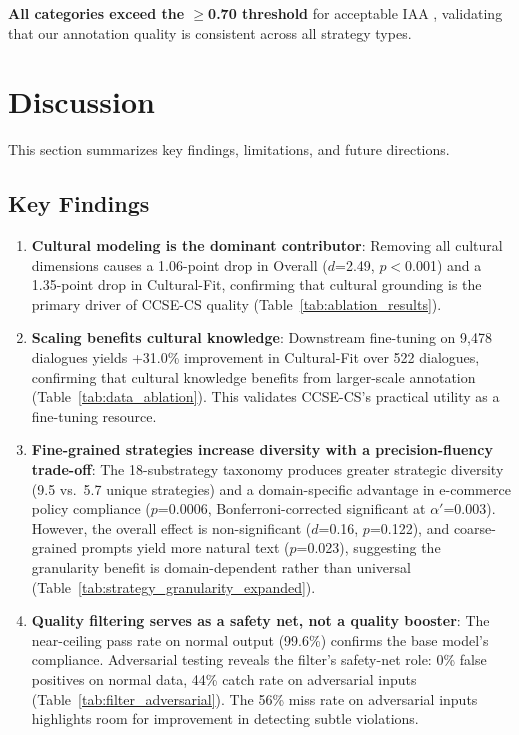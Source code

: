 \documentclass[11pt]{article}
\begin{document}
\begin{table}[t]
\textbf{All categories exceed the $\geq$0.70 threshold} for acceptable IAA \cite{IAA_metric_selection_2024}, validating that our annotation quality is consistent across all strategy types.

\section{Discussion}

This section summarizes key findings, limitations, and future directions.

\subsection{Key Findings}

\begin{enumerate}
  \item \textbf{Cultural modeling is the dominant contributor}: Removing all cultural dimensions causes a 1.06-point drop in Overall ($d$=2.49, $p<$0.001) and a 1.35-point drop in Cultural-Fit, confirming that cultural grounding is the primary driver of CCSE-CS quality (Table~\ref{tab:ablation_results}).
  \item \textbf{Scaling benefits cultural knowledge}: Downstream fine-tuning on 9,478 dialogues yields +31.0\% improvement in Cultural-Fit over 522 dialogues, confirming that cultural knowledge benefits from larger-scale annotation (Table~\ref{tab:data_ablation}). This validates CCSE-CS's practical utility as a fine-tuning resource.
  \item \textbf{Fine-grained strategies increase diversity with a precision-fluency trade-off}: The 18-substrategy taxonomy produces greater strategic diversity (9.5 vs.\ 5.7 unique strategies) and a domain-specific advantage in e-commerce policy compliance ($p$=0.0006, Bonferroni-corrected significant at $\alpha'$=0.003). However, the overall effect is non-significant ($d$=0.16, $p$=0.122), and coarse-grained prompts yield more natural text ($p$=0.023), suggesting the granularity benefit is domain-dependent rather than universal (Table~\ref{tab:strategy_granularity_expanded}).
  \item \textbf{Quality filtering serves as a safety net, not a quality booster}: The near-ceiling pass rate on normal output (99.6\%) confirms the base model's compliance. Adversarial testing reveals the filter's safety-net role: 0\% false positives on normal data, 44\% catch rate on adversarial inputs (Table~\ref{tab:filter_adversarial}). The 56\% miss rate on adversarial inputs highlights room for improvement in detecting subtle violations.
\end{enumerate}


\end{table}
\end{document}
